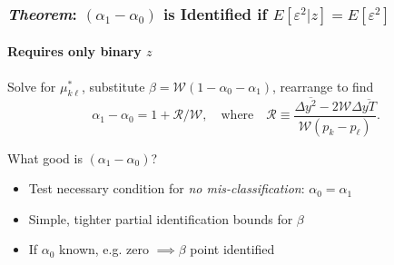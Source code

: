 \documentclass{beamer}
\begin{document}
%
\begin{frame}
  \frametitle{\emph{Theorem}: $(\alpha_1 - \alpha_0)$ is Identified if $E[\varepsilon^2|z] = E[\varepsilon^2]$}
  \framesubtitle{Requires only binary $z$}

    Solve for $\mu_{k\ell}^*$, substitute $\beta = \mathcal{W} (1 - \alpha_0 - \alpha_1)$, rearrange to find
  \begin{equation*}
    \alpha_1 - \alpha_0 = 1 + \mathcal{R}/\mathcal{W}, \quad \mbox{where} \quad
    \mathcal{R} \equiv \frac{\Delta\overline{y^2} - 2 \mathcal{W}\Delta\overline{yT}}{\mathcal{W}(p_k - p_\ell)}.
  \end{equation*}

  \begin{block}{What good is $\left( \alpha_1 - \alpha_0 \right)$?}
    \begin{itemize}
      \item Test necessary condition for \emph{no mis-classification}: $\alpha_0 = \alpha_1$ 
      \item Simple, tighter partial identification bounds for $\beta$
      \item If $\alpha_0$ known, e.g. zero $\implies \beta$ point identified 
    \end{itemize}
  \end{block}

\end{frame}
\end{document}

